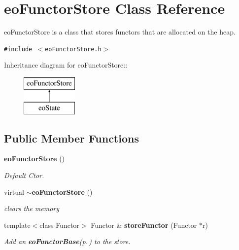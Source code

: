 \section{eo\-Functor\-Store Class Reference}
\label{classeo_functor_store}
eo\-Functor\-Store is a class that stores functors that are allocated on the heap.  


{\tt \#include $<$eo\-Functor\-Store.h$>$}

Inheritance diagram for eo\-Functor\-Store::\begin{figure}[H]
\begin{center}
\leavevmode
\includegraphics[height=2cm]{classeo_functor_store}
\end{center}
\end{figure}
\subsection*{Public Member Functions}
\begin{CompactItemize}
\item 
{\bf eo\-Functor\-Store} ()\label{classeo_functor_store_a0}

\begin{CompactList}\small\item\em Default Ctor. \item\end{CompactList}\item 
virtual {\bf $\sim$eo\-Functor\-Store} ()\label{classeo_functor_store_a1}

\begin{CompactList}\small\item\em clears the memory \item\end{CompactList}\item 
template$<$class Functor$>$ Functor \& {\bf store\-Functor} (Functor $\ast$r)\label{classeo_functor_store_a2}

\begin{CompactList}\small\item\em Add an {\bf eo\-Functor\-Base}{\rm (p.\,\pageref{classeo_functor_base})} to the store. \item\end{CompactList}\end{CompactItemize}

